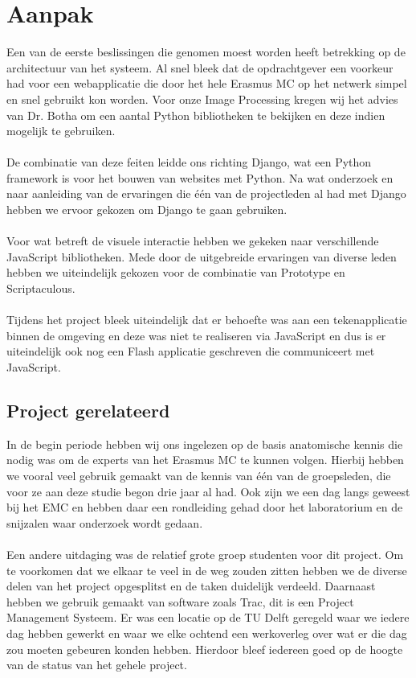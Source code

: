 \section{Aanpak}
\label{Aanpak}
Een van de eerste beslissingen die genomen moest worden heeft betrekking op de architectuur van het systeem. 
Al snel bleek dat de opdrachtgever een voorkeur had voor een webapplicatie die door het hele Erasmus MC op het netwerk simpel en snel gebruikt kon worden. 
Voor onze Image Processing kregen wij het advies van Dr. Botha om een aantal Python bibliotheken te bekijken en deze indien mogelijk te gebruiken. 
\\
\\
De combinatie van deze feiten leidde ons richting Django, wat een Python framework is voor het bouwen van websites met Python. 
Na wat onderzoek en naar aanleiding van de ervaringen die \'{e}\'{e}n van de projectleden al had met Django hebben we ervoor gekozen om Django te gaan gebruiken. 
\\
\\
Voor wat betreft de visuele interactie hebben we gekeken naar verschillende JavaScript bibliotheken. Mede door de uitgebreide ervaringen van diverse leden hebben we uiteindelijk gekozen voor de combinatie van Prototype en Scriptaculous.
\\
\\
Tijdens het project bleek uiteindelijk dat er behoefte was aan een tekenapplicatie binnen de omgeving en deze was niet te realiseren via JavaScript en dus is er uiteindelijk ook nog een Flash applicatie geschreven die communiceert met JavaScript.

\subsection{Project gerelateerd}
\label{aanpak_project_gerelateerd}
In de begin periode hebben wij ons ingelezen op de basis anatomische kennis die nodig was om de experts van het Erasmus MC te kunnen volgen. Hierbij hebben we vooral veel gebruik gemaakt van de kennis van \'{e}\'{e}n van de groepsleden, die voor ze aan deze studie begon drie jaar al had. Ook zijn we een dag langs geweest bij het EMC en hebben daar een rondleiding gehad door het laboratorium en de snijzalen waar onderzoek wordt gedaan. 
\\
\\
Een andere uitdaging was de relatief grote groep studenten voor dit project. 
Om te voorkomen dat we elkaar te veel in de weg zouden zitten hebben we de diverse delen van het project opgesplitst en de taken duidelijk verdeeld. 
Daarnaast hebben we gebruik gemaakt van software zoals Trac, dit is een Project Management Systeem. 
Er was een locatie op de TU Delft geregeld waar we iedere dag hebben gewerkt en waar we elke ochtend een werkoverleg over wat er die dag zou moeten gebeuren konden hebben. 
Hierdoor bleef iedereen goed op de hoogte van de status van het gehele project.

